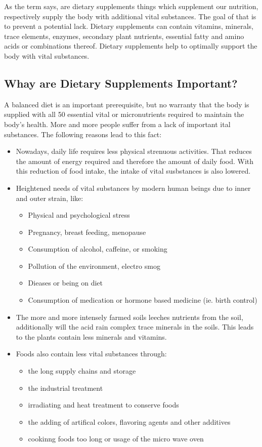 \documentclass[../main.tex]{subfiles}
\begin{document}
As the term says, are dietary supplements things which supplement our nutrition,
respectively supply the body with additional vital substances.
The goal of that is to prevent a potential lack.
Dietary supplements can contain vitamins, minerals, trace elements, enzymes, secondary plant nutrients,
essential fatty and amino acids or combinations thereof.
Dietary supplements help to optimally support the body with vital substances.

\subsection{Whay are Dietary Supplements Important?}
A balanced diet is an important prerequisite, but no warranty that the body is supplied with all 50
essential vital or micronutrients required to maintain the body's health.
More and more people suffer from a lack of important ital substances.
The following reasons lead to this fact:

\renewcommand{\labelitemii}{$\star$}
\begin{itemize}
\item Nowadays, daily life requires less physical strenuous activities.
  That reduces the amount of energy required and therefore the amount of daily food.
  With this reduction of food intake, the intake of vital susbstances is also lowered.
\item Heightened needs of vital substances by modern human beings due to inner and outer strain, like:
  \begin{itemize}
  \item Physical and psychological stress
  \item Pregnancy, breast feeding, menopause
  \item Consumption of alcohol, caffeine, or smoking
  \item Pollution of the environment, electro smog
  \item Dieases or being on diet
    \item Consumption of medication or hormone based medicine (ie. birth control)
    \end{itemize}
  \item The more and more intensely farmed soils leeches nutrients from the soil,
    additionally will the acid rain complex trace minerals in the soils.
    This leads to the plants contain less minerals and vitamins.
  \item Foods also contain less vital substances through:
    \begin{itemize}
    \item the long supply chains and storage
    \item the industrial treatment
    \item irradiating and heat treatment to conserve foods
    \item the adding of artifical colors, flavoring agents and other additives
      \item cookinng foods too long or usage of the micro wave oven
    \end{itemize}
\end{itemize}
\end{document}

